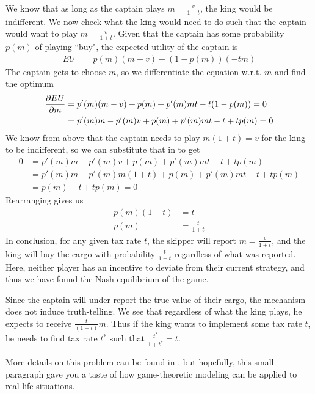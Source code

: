 We know that as long as the captain plays $m = \frac{v}{1 + t}$, the king would be indifferent. We now check what the king would need to do such that the captain would want to play $m = \frac{v}{1+t}$. Given that the captain has some probability $p(m)$ of playing ``buy", the expected utility of the captain is
\begin{align*}
    EU &= p(m)(m - v) + (1 - p(m))(-tm)
\end{align*}
The captain gets to choose $m$, so we differentiate the equation w.r.t. $m$ and find the optimum
\begin{align*}
    \frac{\partial EU}{\partial m} & = p'(m)(m-v) + p(m) + p'(m)mt -t(1-p(m)) = 0 \\
    & = p'(m)m - p'(m)v + p(m) + p'(m)mt -t + tp(m) = 0
\end{align*}
We know from above that the captain needs to play $m(1+t) = v$ for the king to be indifferent, so we can substitute that in to get
\begin{align*}
    0 & = p'(m)m - p'(m)v + p(m) + p'(m)mt -t + tp(m) \\
    & =  p'(m)m - p'(m)m(1+t)  + p(m) + p'(m)mt -t + tp(m) \\
    & = p(m) -t + tp(m) = 0
\end{align*}
Rearranging gives us
\begin{align*}
    p(m)(1 + t) & = t\\
    p(m) & = \frac{t}{1+t}
\end{align*}
In conclusion, for any given tax rate $t$, the skipper will report $m = \frac{v}{1+t}$, and the king will buy the cargo with probability $\frac{t}{1+t}$ regardless of what was reported. Here, neither player has an incentive to deviate from their current strategy, and thus we have found the Nash equilibrium of the game. 

Since the captain will under-report the true value of their cargo, the mechanism does not induce truth-telling. We see that regardless of what the king plays, he expects to receive $\frac{t}{(1+t)}m$. Thus if the king wants to implement some tax rate $t$, he needs to find tax rate $t^*$ such that $\frac{t^*}{1+t^*} = t$.

More details on this problem can be found in \citet{Haan_2012_Taxation}, but hopefully, this small paragraph gave you a taste of how game-theoretic modeling can be applied to real-life situations. 
